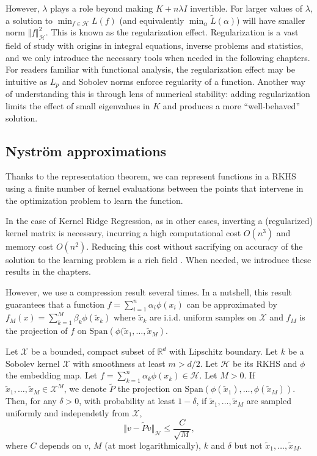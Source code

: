 However, $\lambda$ plays a role beyond making $K+n\lambda I$ invertible. For larger values of $\lambda$, a solution to $\min_{f\in\mathcal H}L(f)$ (and equivalently $\min_\alpha \tilde L(\alpha)$) will have smaller norm $\Vert f \Vert_\mathcal H^2$. This is known as the regularization effect. Regularization is a vast field of study with origins in integral equations, inverse problems and statistics, and we only introduce the necessary tools when needed in the following chapters. For readers familiar with functional analysis, the regularization effect may be intuitive as $L_p$ and Sobolev norms enforce regularity of a function. Another way of understanding this is through lens of numerical stability: adding regularization limits the effect of small eigenvalues in $K$ and produces a more ``well-behaved'' solution.


\subsection{Nyström approximations}

Thanks to the representation theorem, we can represent functions in a RKHS using a finite number of kernel evaluations between the points that intervene in the optimization problem to learn the function.

In the case of Kernel Ridge Regression, as in other cases, inverting a (regularized) kernel matrix is necessary, incurring a high computational cost $O(n^3)$ and memory cost $O(n^2)$. Reducing this cost without sacrifying on accuracy of the solution to the learning problem is a rich field \citep{refs}. When needed, we introduce these results in the chapters.

However, we use a compression result several times. In a nutshell, this result guarantees that a function $f=\sum_{i=1}^n\alpha_i\phi(x_i)$ can be approximated by $f_M(x) = \sum_{k=1}^M \beta_k \phi(\tilde x_k)$ where $\tilde x_k$ are i.i.d. uniform samples on $\mathcal X $ and $f_M$ is the projection of $f$ on $\mathrm{Span}\left(\phi(\tilde x_1, \ldots, \tilde x_M\right)$.

\begin{mdframed}
\begin{proposition}
Let $\mathcal X$ be a bounded, compact subset of $\mathbb R^d$ with Lipschitz boundary.
Let $k$ be a Sobolev kernel $\mathcal X$ with smoothness at least $m > d / 2$. Let $\mathcal H$ be its RKHS and $\phi$ the embedding map. Let $f = \sum_{k=1}^n\alpha_k \phi(x_k) \in\mathcal H$. Let $M > 0$. If $\tilde x_1, \ldots, \tilde x_M \in \mathcal X^M$, we denote $\tilde P$ the projection on $\mathrm{Span}\left(\phi(\tilde x_1), \ldots, \phi(\tilde x_M)\right)$. Then, for any $\delta > 0$, with probability at least $1-\delta$, if $\tilde x_1, \ldots, \tilde x_M$ are sampled uniformly and independetly from $\mathcal X$,
\begin{equation}
    \Vert v - \tilde Pv \Vert_\mathcal H \leq \frac{C}{\sqrt{M}},
\end{equation}
where $C$ depends on $v$, $M$ (at most logarithmically), $k$ and $\delta$ but not $\tilde x_1, \ldots, \tilde x_M$.
\end{proposition}
\end{mdframed}

